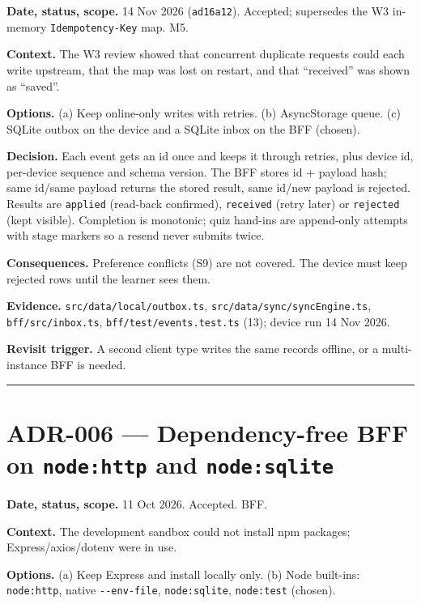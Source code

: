 \documentclass[
  11pt,
]{article}
\begin{document}
\textbf{Date, status, scope.} 14 Nov 2026 (\texttt{ad16a12}). Accepted;
supersedes the W3 in-memory \texttt{Idempotency-Key} map. M5.

\textbf{Context.} The W3 review showed that concurrent duplicate
requests could each write upstream, that the map was lost on restart,
and that ``received'' was shown as ``saved''.

\textbf{Options.} (a) Keep online-only writes with retries. (b)
AsyncStorage queue. (c) SQLite outbox on the device and a SQLite inbox
on the BFF (chosen).

\textbf{Decision.} Each event gets an id once and keeps it through
retries, plus device id, per-device sequence and schema version. The BFF
stores id + payload hash; same id/same payload returns the stored
result, same id/new payload is rejected. Results are \texttt{applied}
(read-back confirmed), \texttt{received} (retry later) or
\texttt{rejected} (kept visible). Completion is monotonic; quiz hand-ins
are append-only attempts with stage markers so a resend never submits
twice.

\textbf{Consequences.} Preference conflicts (S9) are not covered. The
device must keep rejected rows until the learner sees them.

\textbf{Evidence.} \texttt{src/data/local/outbox.ts},
\texttt{src/data/sync/syncEngine.ts}, \texttt{bff/src/inbox.ts},
\texttt{bff/test/events.test.ts} (13); device run 14 Nov 2026.

\textbf{Revisit trigger.} A second client type writes the same records
offline, or a multi-instance BFF is needed.

\begin{center}\rule{0.5\linewidth}{0.5pt}\end{center}

\hypertarget{adr-006-dependency-free-bff-on-nodehttp-and-nodesqlite}{%
\section{\texorpdfstring{ADR-006 --- Dependency-free BFF on
\texttt{node:http} and
\texttt{node:sqlite}}{ADR-006 --- Dependency-free BFF on node:http and node:sqlite}}\label{adr-006-dependency-free-bff-on-nodehttp-and-nodesqlite}}

\textbf{Date, status, scope.} 11 Oct 2026. Accepted. BFF.

\textbf{Context.} The development sandbox could not install npm
packages; Express/axios/dotenv were in use.

\textbf{Options.} (a) Keep Express and install locally only. (b) Node
built-ins: \texttt{node:http}, native \texttt{-\/-env-file},
\texttt{node:sqlite}, \texttt{node:test} (chosen).
\end{document}

